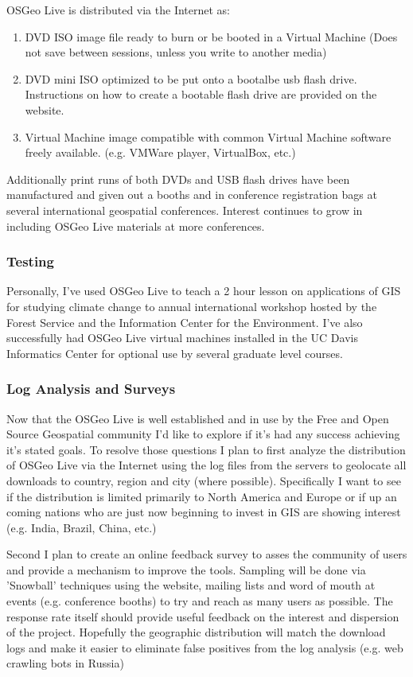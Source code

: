 \documentclass[12pt,letterpaper]{article}
\begin{document}
OSGeo Live is distributed via the Internet as:
\begin{enumerate}
\item DVD ISO image file ready to burn or be booted in a Virtual Machine (Does not save between sessions, unless you write to another media)
\item DVD mini ISO optimized to be put onto a bootalbe usb flash drive. Instructions on how to create a bootable flash drive are provided on the website.
\item Virtual Machine image compatible with common Virtual Machine software freely available. (e.g. VMWare player, VirtualBox, etc.)
\end{enumerate}

Additionally print runs of both DVDs and USB flash drives have been manufactured and given out a booths and in conference registration bags at several international geospatial conferences. Interest continues to grow in including OSGeo Live materials at more conferences.

\subsubsection{Testing}
Personally, I've used OSGeo Live to teach a 2 hour lesson on applications of GIS for studying climate change to annual international workshop hosted by the Forest Service and the Information Center for the Environment. I've also successfully had OSGeo Live virtual machines installed in the UC Davis Informatics Center for optional use by several graduate level courses. 


\subsubsection{Log Analysis and Surveys}
Now that the OSGeo Live is well established and in use by the Free and Open Source Geospatial community I'd like to explore if it's had any success achieving it's stated goals. To resolve those questions I plan to first analyze the distribution of OSGeo Live via the Internet using the log files from the servers to geolocate all downloads to country, region and city (where possible). Specifically I want to see if the distribution is limited primarily to North America and Europe or if up an coming nations who are just now beginning to invest in GIS are showing interest (e.g. India, Brazil, China, etc.)
 
Second I plan to create an online feedback survey to asses the community of users and provide a mechanism to improve the tools. Sampling will be done via 'Snowball' techniques using the  website, mailing lists and word of mouth at events (e.g. conference booths) to try and reach as many users as possible. The response rate itself should provide useful feedback on the interest and dispersion of the project. Hopefully the geographic distribution will match the download logs and make it easier to eliminate false positives from the log analysis (e.g. web crawling bots in Russia)
\end{document}

